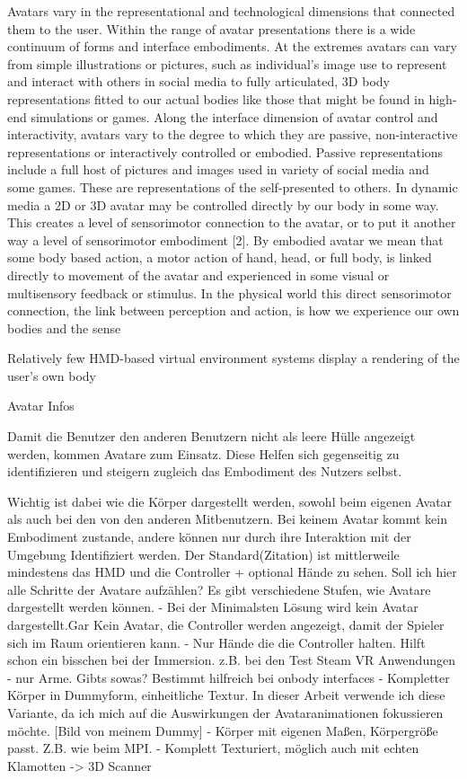 Avatars vary in the representational and technological dimensions that connected
them to the user. Within the range of avatar presentations there is a wide continuum of forms and interface embodiments. At the extremes avatars can vary from simple illustrations or pictures, such as individual’s image use to represent and interact with others in social media to fully articulated, 3D body representations fitted to our actual bodies like those that might be found in high-end simulations or games. Along the interface dimension of avatar control and interactivity, avatars vary to
the degree to which they are passive, non-interactive representations or interactively controlled or embodied. Passive representations include a full host of pictures and images used in variety of social media and some games. These are representations of the self-presented to others. In dynamic media a 2D or 3D avatar may be controlled directly by our body in
some way. This creates a level of sensorimotor connection to the avatar, or to put it another way a level of sensorimotor embodiment [2]. By embodied avatar we mean that some body based action, a motor action of hand, head, or full body, is linked directly to movement of the avatar and experienced in some visual or multisensory feedback or stimulus. In the physical world this direct sensorimotor connection, the link between perception and action, is how we experience our own bodies and the sense

Relatively few HMD-based virtual environment systems display a rendering of the user’s own body\cite{Pan2017}

Avatar Infos \cite{Biocca2014}


Damit die Benutzer den anderen Benutzern nicht als leere Hülle angezeigt werden, kommen Avatare zum Einsatz. Diese Helfen sich gegenseitig zu identifizieren und steigern zugleich das Embodiment des Nutzers selbst. 

Wichtig ist dabei wie die Körper dargestellt werden, sowohl beim eigenen Avatar als auch bei den von den anderen Mitbenutzern. Bei keinem Avatar kommt kein Embodiment zustande, andere können nur durch ihre Interaktion mit der Umgebung Identifiziert werden. Der Standard(Zitation) ist mittlerweile mindestens das HMD und die Controller + optional Hände zu sehen. \cite{Benford2010}
Soll ich hier alle Schritte der Avatare aufzählen?
Es gibt verschiedene Stufen, wie Avatare dargestellt werden können.
- Bei der Minimalsten Lösung wird kein Avatar dargestellt.Gar Kein Avatar, die Controller werden angezeigt, damit der Spieler sich im Raum orientieren kann.
- Nur Hände die die Controller halten. Hilft schon ein bisschen bei der Immersion. z.B. bei den Test Steam VR Anwendungen
- nur Arme. Gibts sowas? Bestimmt hilfreich bei onbody interfaces
- Kompletter Körper in Dummyform, einheitliche Textur. In dieser Arbeit verwende ich diese Variante, da ich mich auf die Auswirkungen der Avataranimationen fokussieren möchte. 
[Bild von meinem Dummy]
- Körper mit eigenen Maßen, Körpergröße passt. Z.B. wie beim MPI. 
- Komplett Texturiert, möglich auch mit echten Klamotten -> 3D Scanner

